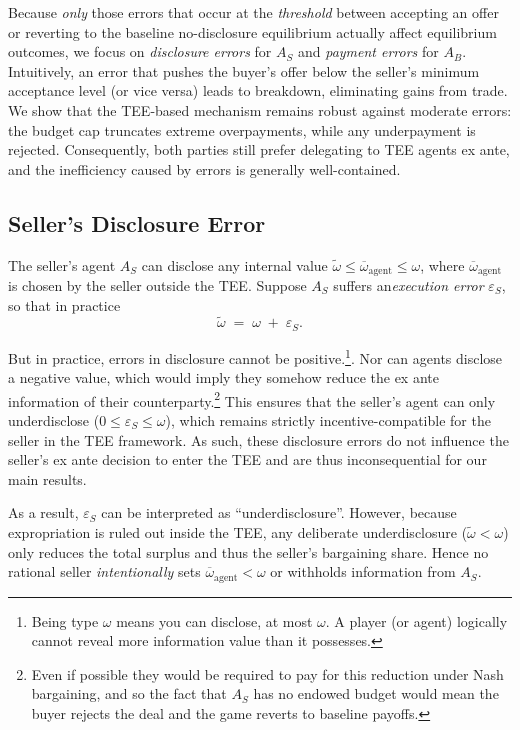 \documentclass{article}
\begin{document}
Because \emph{only} those errors that occur at the \textit{threshold} 
between accepting an offer or reverting to the baseline no-disclosure 
equilibrium actually affect equilibrium outcomes, we focus on 
\emph{disclosure errors} for $A_S$ and \emph{payment errors} for $A_B$. 
Intuitively, an error that pushes the buyer’s offer below the seller’s 
minimum acceptance level (or vice versa) leads to breakdown, eliminating 
gains from trade. We show that the TEE-based mechanism remains robust 
against moderate errors: the budget cap truncates extreme overpayments, 
while any underpayment is rejected. Consequently, both parties still 
prefer delegating to TEE agents ex ante, and the inefficiency caused by 
errors is generally well-contained.

\subsection{Seller’s Disclosure Error}
\label{sec:seller-error}

The seller’s agent $A_S$ 
can disclose any internal value 
\(\tilde{\omega} \le \overline{\omega}_{\text{agent}} \le \omega\), 
where $\overline{\omega}_{\text{agent}}$ is chosen by the seller 
outside the TEE. Suppose $A_S$ suffers an\emph{execution error} 
$\varepsilon_S$, so that in practice
\[
  \tilde{\omega} \;=\; \omega \;+\; \varepsilon_S.
\]

But in practice, errors in disclosure cannot be positive.\footnote{Being type $\omega$ means you can disclose, at most $\omega$. A player (or agent) logically cannot reveal more information value than it possesses.}. Nor can agents disclose a negative value, which would imply they somehow reduce the ex ante information of their counterparty.\footnote{Even if possible they would be required to pay for this reduction under Nash bargaining, and so the fact that $A_S$ has no endowed budget would mean the buyer rejects the deal and the game reverts to baseline payoffs.} This ensures that the seller's agent can only underdisclose ($0 \le \varepsilon_S \le \omega$), which remains strictly incentive-compatible for the seller in the TEE framework. As such, these disclosure errors do not influence the seller’s ex ante decision to enter the TEE and are thus inconsequential for our main results.

As a result, $\varepsilon_S$ can be interpreted as “underdisclosure”. However, because expropriation is 
ruled out inside the TEE, any deliberate underdisclosure 
($\tilde{\omega} < \omega$) only reduces the total surplus and thus the 
seller’s bargaining share. Hence no rational seller 
\emph{intentionally} sets $\overline{\omega}_{\text{agent}} < \omega$ 
or withholds information from $A_S$. 
\end{document}
